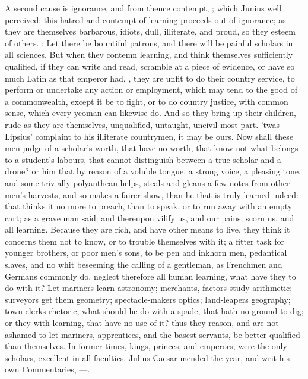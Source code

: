 {A second cause is ignorance, and from thence contempt, ; which Junius well perceived: this
hatred and contempt of learning proceeds out of ignorance; as
they are themselves barbarous, idiots, dull, illiterate, and proud, so
they esteem of others. : Let
there be bountiful patrons, and there will be painful scholars in all
sciences. But when they contemn learning, and think themselves
sufficiently qualified, if they can write and read, scramble at a piece
of evidence, or have so much Latin as that emperor had, , they are unfit to do their country
service, to perform or undertake any action or employment, which may
tend to the good of a commonwealth, except it be to fight, or to do
country justice, with common sense, which every yeoman can likewise do.
And so they bring up their children, rude as they are themselves,
unqualified, untaught, uncivil most part.  'twas Lipsius' complaint to his illiterate
countrymen, it may be ours. Now shall these men judge of a scholar's
worth, that have no worth, that know not what belongs to a student's
labours, that cannot distinguish between a true scholar and a drone? or
him that by reason of a voluble tongue, a strong voice, a pleasing
tone, and some trivially polyanthean helps, steals and gleans a few
notes from other men's harvests, and so makes a fairer show, than he
that is truly learned indeed: that thinks it no more to preach, than to
speak, or to run away with an empty cart; as a grave man said:
and thereupon vilify us, and our pains; scorn us, and all learning.
 Because they are rich, and have other means to live, they think
it concerns them not to know, or to trouble themselves with it; a
fitter task for younger brothers, or poor men's sons, to be pen and
inkhorn men, pedantical slaves, and no whit beseeming the calling of a
gentleman, as Frenchmen and Germans commonly do, neglect therefore all
human learning, what have they to do with it? Let mariners learn
astronomy; merchants, factors study arithmetic; surveyors get them
geometry; spectacle-makers optics; land-leapers geography; town-clerks
rhetoric, what should he do with a spade, that hath no ground to dig;
or they with learning, that have no use of it? thus they reason, and
are not ashamed to let mariners, apprentices, and the basest servants,
be better qualified than themselves. In former times, kings, princes,
and emperors, were the only scholars, excellent in all faculties.
Julius Caesar mended the year, and writ his own Commentaries,
---.

}
